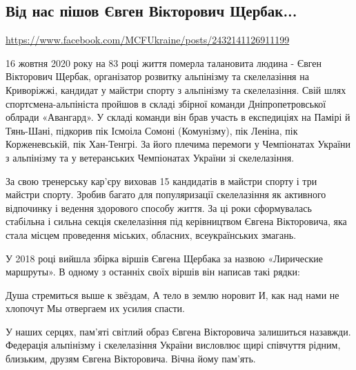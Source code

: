  
 

\subsection{Від нас пішов Євген Вікторович Щербак...}
\label{sec:17_10_2020.fb.fais.1.evgen_scherbak_death}

\url{https://www.facebook.com/MCFUkraine/posts/2432141126911199}

16 жовтня 2020 року на 83 році життя померла талановита людина - Євген
Вікторович Щербак, організатор розвитку альпінізму та скелелазіння на
Криворіжжі, кандидат у майстри спорту з альпінізму та скелелазіння. Свій шлях
спортсмена-альпініста пройшов в складі збірної команди Дніпропетровської
облради «Авангард». У складі команди він брав участь в експедиціях на Памірі й
Тянь-Шані, підкорив пік Ісмоіла Сомоні (Комунізму), пік Леніна, пік
Корженевській, пік Хан-Тенгрі. За його плечима перемоги у Чемпіонатах України з
альпінізму та у ветеранських Чемпіонатах України зі скелелазіння. 

За свою тренерську кар'єру виховав 15 кандидатів в майстри спорту і три майстри
спорту.  Зробив багато для популяризації скелелазіння як активного відпочинку і
ведення здорового способу життя. За ці роки сформувалась стабільна і сильна
секція скелелазіння під керівництвом Євгена Вікторовича, яка стала місцем
проведення міських, обласних, всеукраїнських змагань.

У 2018 році вийшла збірка віршів Євгена Щербака за назвою «Лирические
маршруты». В одному з останніх своїх віршів він написав такі рядки:

Душа стремиться выше к звёздам,
А тело в землю норовит
И, как над нами не хлопочут
Мы отвергаем их усилия спасти.

У наших серцях, пам'яті світлий образ Євгена Вікторовича залишиться назавжди.
Федерація альпінізму і скелелазіння України висловлює щирі співчуття рідним,
близьким, друзям Євгена Вікторовича. Вічна йому пам'ять.

